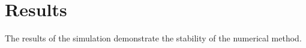 \section{Results}
\label{sec:results}

The results of the simulation demonstrate the stability of the numerical method.
